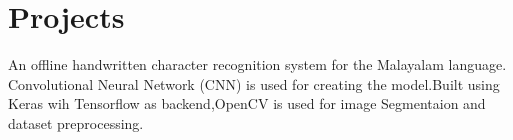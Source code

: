 \documentclass[11pt]{hieudo-build}
\begin{document}
\begin{minipage}[t]{0.63\textwidth}




%
%



\sectionsep

\section{Projects}
\descript{}
\par \noindent
An offline handwritten character recognition system for the Malayalam language. Convolutional Neural Network (CNN) is used for creating the model.Built using Keras wih Tensorflow as backend,OpenCV is used for image Segmentaion and dataset preprocessing.    
\sectionsep


\end{minipage}
\end{document}
